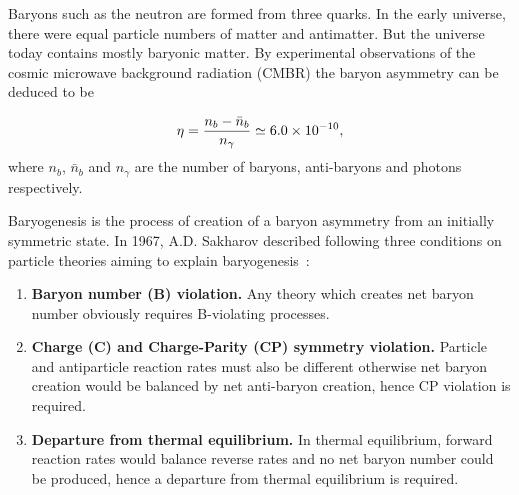 Baryons such as the neutron are formed from three quarks. In the early universe, there were equal particle numbers of matter and antimatter. But the universe today contains mostly baryonic matter. By experimental observations of the cosmic microwave background radiation (CMBR) the baryon asymmetry can be deduced to be~\cite{expBar}


\begin{equation}\label{eq:baryons}
    \eta =\frac{n_b-\bar{n}_b}{n_\gamma}\simeq 6.0 \times 10^{-10}{\rm ,}
\end{equation}
where $n_b$, $\bar{n}_b$ and ${n_\gamma}$ are the number of baryons, anti-baryons and photons respectively. 



Baryogenesis is the process of creation of a baryon asymmetry from an initially symmetric state. In 1967, A.D. Sakharov described following three conditions on particle theories aiming to explain baryogenesis~\cite{Sakharov:1967dj}:
\begin{enumerate}
    \item {\bf Baryon number (B) violation.} Any theory which creates net baryon number obviously requires B-violating processes.
    \item {\bf Charge (C) and Charge-Parity (CP) symmetry violation.} Particle and antiparticle reaction rates must also be different otherwise net baryon creation would be balanced by net anti-baryon creation, hence CP violation is required.
    \item {\bf Departure from thermal equilibrium.} In thermal equilibrium, forward reaction rates would balance reverse rates and no net baryon number could be produced, hence a departure from thermal equilibrium is required.
\end{enumerate}

